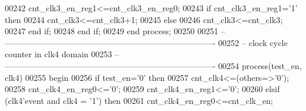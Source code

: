 \begin{DoxyCode}
00242             \textcolor{vhdlchar}{cnt_clk3_en_reg1}\textcolor{vhdlchar}{<=}\textcolor{vhdlchar}{cnt_clk3_en_reg0};
00243           \textcolor{keywordflow}{if} \textcolor{vhdlchar}{cnt_clk3_en_reg1}\textcolor{vhdlchar}{=}\textcolor{vhdlchar}{'}\textcolor{vhdllogic}{}\textcolor{vhdllogic}{1}\textcolor{vhdlchar}{'} \textcolor{keywordflow}{then} 
00244                 \textcolor{vhdlchar}{cnt_clk3}\textcolor{vhdlchar}{<=}\textcolor{vhdlchar}{cnt_clk3}\textcolor{vhdlchar}{+}\textcolor{vhdllogic}{}\textcolor{vhdllogic}{1};
00245             \textcolor{keywordflow}{else} 
00246                 \textcolor{vhdlchar}{cnt_clk3}\textcolor{vhdlchar}{<=}\textcolor{vhdlchar}{cnt_clk3};
00247             \textcolor{keywordflow}{end} \textcolor{keywordflow}{if};
00248         \textcolor{keywordflow}{end} \textcolor{keywordflow}{if};
00249     \textcolor{keywordflow}{end} \textcolor{keywordflow}{process};
00250 
00251 \textcolor{keyword}{-- ----------------------------------------------------------------------------}
00252 \textcolor{keyword}{-- clock cycle counter in clk4 domain}
00253 \textcolor{keyword}{-- ----------------------------------------------------------------------------}
00254   \textcolor{keywordflow}{process}(test_en, clk4)
00255 \textcolor{vhdlkeyword}{    begin}
00256       \textcolor{keywordflow}{if} \textcolor{vhdlchar}{test_en}\textcolor{vhdlchar}{=}\textcolor{vhdlchar}{'}\textcolor{vhdllogic}{}\textcolor{vhdllogic}{0}\textcolor{vhdlchar}{'} \textcolor{keywordflow}{then}
00257             \textcolor{vhdlchar}{cnt_clk4}\textcolor{vhdlchar}{<=}\textcolor{vhdlchar}{(}\textcolor{keywordflow}{others}\textcolor{vhdlchar}{=}\textcolor{vhdlchar}{>}\textcolor{vhdlchar}{'}\textcolor{vhdllogic}{}\textcolor{vhdllogic}{0}\textcolor{vhdlchar}{'}\textcolor{vhdlchar}{)};
00258             \textcolor{vhdlchar}{cnt_clk4_en_reg0}\textcolor{vhdlchar}{<=}\textcolor{vhdlchar}{'}\textcolor{vhdllogic}{}\textcolor{vhdllogic}{0}\textcolor{vhdlchar}{'};
00259             \textcolor{vhdlchar}{cnt_clk4_en_reg1}\textcolor{vhdlchar}{<=}\textcolor{vhdlchar}{'}\textcolor{vhdllogic}{}\textcolor{vhdllogic}{0}\textcolor{vhdlchar}{'}; 
00260         \textcolor{keywordflow}{elsif} \textcolor{vhdlchar}{(}\textcolor{vhdlchar}{clk4}\textcolor{vhdlchar}{'}\textcolor{vhdlkeyword}{event} \textcolor{keywordflow}{and} \textcolor{vhdlchar}{clk4} \textcolor{vhdlchar}{=} \textcolor{vhdlchar}{'}\textcolor{vhdllogic}{}\textcolor{vhdllogic}{1}\textcolor{vhdlchar}{'}\textcolor{vhdlchar}{)} \textcolor{keywordflow}{then}
00261             \textcolor{vhdlchar}{cnt_clk4_en_reg0}\textcolor{vhdlchar}{<=}\textcolor{vhdlchar}{cnt_clk_en};

\end{DoxyCode}
